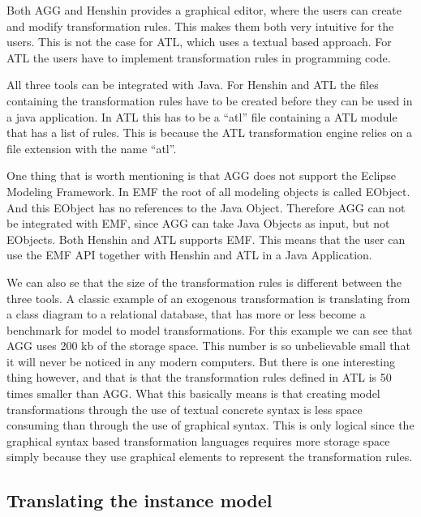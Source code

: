 Both AGG and Henshin provides a graphical editor, where the users can create and
modify transformation rules. This makes them both very intuitive for the users.
This is not the case for ATL, which uses a textual based approach. For ATL the
users have to implement transformation rules in programming code.

All three tools can be integrated with Java. For Henshin and ATL the files
containing the transformation rules have to be created before they can be used
in a java application. In ATL this has to be a ``atl'' file containing a ATL
module that has a list of rules. This is because the ATL transformation engine
relies on a file extension with the name ``atl''.

One thing that is worth mentioning is that AGG does not support the Eclipse
Modeling Framework. In EMF the root of all modeling objects is called
EObject. And this EObject has no references to the Java Object. Therefore AGG
can not be integrated with EMF, since AGG can take Java Objects as input,
but not EObjects. Both Henshin and ATL supports EMF. This means that the user
can use the EMF API together with Henshin and ATL in a Java Application.

We can also se that the size of the transformation rules is different
between the three tools. A classic example of an exogenous transformation is
translating from a class diagram to a relational database, that has more or less become a
benchmark for model to model transformations. For this example we can see that
AGG uses 200 kb of the storage space. This number is so unbelievable small
that it will never be noticed in any modern computers. But there is one
interesting thing however, and that is that the transformation rules defined in
ATL is 50 times smaller than AGG. What this basically means is that creating model
transformations through the use of textual concrete syntax is less space
consuming than through the use of graphical syntax. This is only logical since
the graphical syntax based transformation languages requires more storage
space simply because they use graphical elements to represent the transformation
rules.

\subsection{Translating the instance model}

